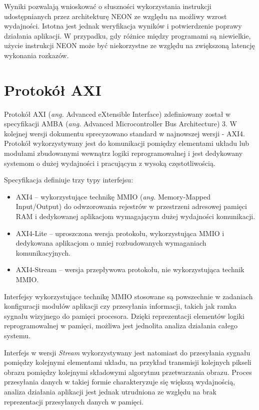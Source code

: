 Wyniki pozwalają wnioskować o słuszności wykorzystania instrukcji udostępnianych przez architekturę NEON ze względu na możliwy wzrost wydajności. Istotna jest jednak weryfikacja wyników i potwierdzenie poprawy działania aplikacji. W przypadku, gdy różnice między programami są niewielkie, użycie instrukcji NEON może być niekorzystne ze względu na zwiększoną latencję wykonania rozkazów.

\section{Protokół AXI}
\label{sec:axi-std}
Protokół AXI (\emph{ang.} Advanced eXtensible Interface) zdefiniowany został w specyfikacji AMBA (\emph{ang.} Advanced Microcontroller Bus Architecture) 3. W kolejnej wersji dokumentu sprecyzowano standard w najnowszej wersji - AXI4. \cite{axi-spec} Protokół wykorzystywany jest do komunikacji pomiędzy elementami układu lub modułami zbudowanymi wewnątrz logiki reprogramowalnej i jest dedykowany systemom o dużej wydajności i pracującym z wysoką częstotliwością.

Specyfikacja definiuje trzy typy interfejsu:
\begin{itemize}
	\item AXI4 -- wykorzystujące technikę MMIO (\emph{ang.} Memory-Mapped Input/Output) do odwzorowania rejestrów w przestrzeni adresowej pamięci RAM i dedykowanej aplikacjom wymagającym dużej wydajności komunikacji.
	\item AXI4-Lite -- uproszczona wersja protokołu, wykorzystująca MMIO i dedykowana aplikacjom o mniej rozbudowanych wymaganiach komunikacyjnych.
	\item AXI4-Stream -- wersja przepływowa protokołu, nie wykorzystująca technik MMIO.
\end{itemize}

Interfejsy wykorzystujące technikę MMIO stosowane są powszechnie w zadaniach konfiguracji modułów aplikacji czy przesyłania informacji, takich jak ramka sygnału wizyjnego do pamięci procesora. Dzięki reprezentacji elementów logiki reprogramowalnej w pamięci, możliwa jest jednolita analiza działania całego systemu.

Interfejs w wersji \emph{Stream} wykorzystywany jest natomiast do przesyłania sygnału pomiędzy kolejnymi elementami układu, na przykład transmisji kolejnych pikseli obrazu pomiędzy kolejnymi składowymi algorytmu przetwarzania obrazu. Proces przesyłania danych w takiej formie charakteryzuje się większą wydajnością, analiza działania aplikacji jest jednak utrudniona ze względu na brak reprezentacji przesyłanych danych w pamięci.

